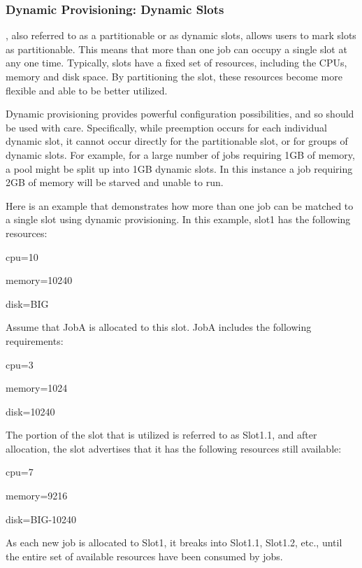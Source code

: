 \subsubsection{\label{sec:SMP-dynamicprovisioning}
Dynamic  Provisioning: Dynamic Slots}

,
also referred to as a partitionable  or as dynamic slots,
allows users to mark slots as partitionable. 
This means that more than one job can occupy a single slot at any one time. 
Typically, slots have a fixed set of resources,
including the CPUs, memory and disk space. 
By partitioning the slot, 
these resources become more flexible and able to be better utilized.

Dynamic provisioning provides powerful configuration
possibilities, and so should be used with care. 
Specifically, while preemption occurs for each individual dynamic slot,
it cannot occur directly for the partitionable slot, 
or for groups of dynamic slots. 
For example, for a large number of jobs requiring 1GB of memory,
a pool might be split up into 1GB dynamic slots. 
In this instance a job requiring 2GB of memory will be starved
and unable to run.

Here is an example that demonstrates how more than one job
can be matched to a single slot using dynamic provisioning.
In this example, slot1 has the following resources:
\begin{description}
  \item{cpu=10}
  \item{memory=10240}
  \item{disk=BIG}
\end{description}
Assume that JobA is allocated to this slot.
JobA includes the following requirements:
\begin{description}
  \item{cpu=3}
  \item{memory=1024}
  \item{disk=10240} 
\end{description}
The portion of the slot that is utilized is referred to as Slot1.1,
and after allocation, the slot advertises that it has
the following resources still available:
\begin{description}
  \item{cpu=7}
  \item{memory=9216}
  \item{disk=BIG-10240}
\end{description}
As each new job is allocated to Slot1,
it breaks into Slot1.1, Slot1.2, etc., until the entire set of
available resources have been consumed by jobs.

